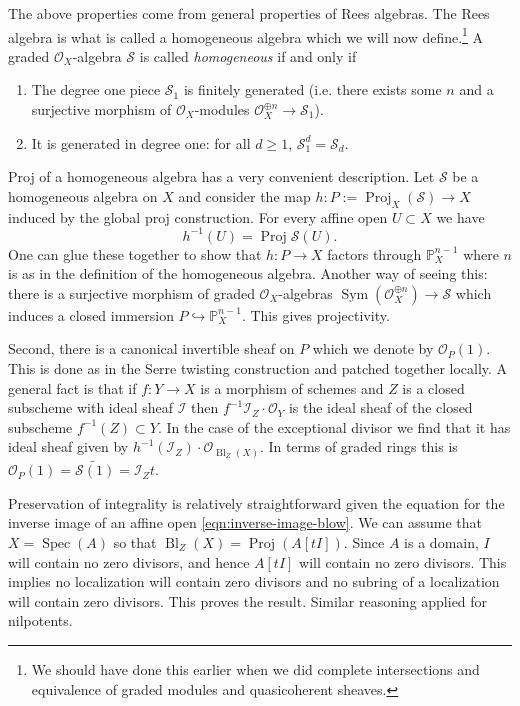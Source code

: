 \documentclass[12pt]{article}
\numberwithin{equation}{section}
\theoremstyle{definition}
\theoremstyle{remark}
\newcommand{\Ocal}{\mathcal{O}}
\newcommand{\PP}{\mathbb{P}}
\newcommand{\Spec}{\operatorname{Spec}}
\newcommand{\Proj}{\operatorname{Proj}}
\newcommand{\Bl}{\operatorname{Bl}}
\newcommand{\Scal}{\mathcal{S}}
\newcommand{\Sym}{\operatorname{Sym}}
\newcommand{\Ical}{\mathcal{I}}
\begin{document}
The above properties come from general properties of Rees algebras.
The Rees algebra is what is called a homogeneous algebra which we will now define.\footnote{We should have done this earlier when we did complete intersections and equivalence of graded modules and quasicoherent sheaves.}
A graded $\Ocal_X$-algebra $\Scal$ is called \emph{homogeneous} if and only if 
	\begin{enumerate}
		\item The degree one piece $\Scal_1$ is finitely generated (i.e. there exists some $n$ and a surjective morphism of $\Ocal_X$-modules $\Ocal_X^{\oplus n}\to\Scal_1$). 
		\item It is generated in degree one: for all $d\geq 1$, $\Scal_1^d = \Scal_d$. 
		\end{enumerate}
Proj of a homogeneous algebra has a very convenient description.
Let $\Scal$ be a homogeneous algebra on $X$ and consider the map $ h: P:=\Proj_X(\Scal) \to X $ induced by the global proj construction.
For every affine open $U\subset X$ we have 
\begin{equation}\label{eqn:inverse-image-blow}
 h^{-1}(U) = \Proj \Scal(U).
\end{equation}
One can glue these together to show that $h:P \to X$ factors through $\PP^{n-1}_X$ where $n$ is as in the definition of the homogeneous algebra. 
Another way of seeing this: there is a surjective morphism of graded $\Ocal_X$-algebras $\Sym(\Ocal_X^{\oplus n}) \to \Scal$ which induces a closed immersion $P \hookrightarrow \PP^{n-1}_X$.
This gives projectivity. 

Second, there is a canonical invertible sheaf on $P$ which we denote by $\Ocal_P(1)$. 
This is done as in the Serre twisting construction and patched together locally. 
A general fact is that if $f:Y\to X$ is a morphism of schemes and $Z$ is a closed subscheme with ideal sheaf $\Ical$ then $f^{-1}\Ical_Z \cdot \Ocal_Y$ is the ideal sheaf of the closed subscheme $f^{-1}(Z) \subset Y$. 
In the case of the exceptional divisor we find that it has ideal sheaf given by $h^{-1}(\Ical_Z)\cdot \Ocal_{\Bl_Z(X)}$.
In terms of graded rings this is $\Ocal_P(1)=\widetilde{\Scal(1)} = \Ical_Zt.$

Preservation of integrality is relatively straightforward given the equation for the inverse image of an affine open \eqref{eqn:inverse-image-blow}.
We can assume that $X=\Spec(A)$ so that $\Bl_Z(X) = \Proj( A[tI] )$. 
Since $A$ is a domain, $I$ will contain no zero divisors, and hence $A[tI]$ will contain no zero divisors. 
This implies no localization will contain zero divisors and no subring of a localization will contain zero divisors. 
This proves the result. 
Similar reasoning applied for nilpotents. 
\end{document}
